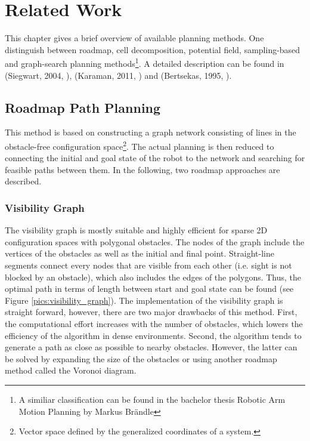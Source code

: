 \chapter{Related Work }
\label{sec:related_work}

This chapter gives a brief overview of available planning methods. One distinguish between roadmap, cell decomposition, potential field, sampling-based and graph-search planning methods\footnote{A similiar classification can be found in the bachelor thesis Robotic Arm Motion Planning by Markus Br\"andle}. A detailed description can be found in (Siegwart, 2004, \cite{Siegwart2004}), (Karaman, 2011, \cite{Karaman2011}) and (Bertsekas, 1995, \cite{Bertsekas1995}).

\section{Roadmap Path Planning}

This method is based on constructing a graph network consisting of lines in the obstacle-free configuration space\footnote{Vector space defined by the generalized coordinates of a system.}. The actual planning is then reduced to connecting the initial and goal state of the robot to the network and searching for feasible paths between them. In the following, two roadmap approaches are described.

\subsection{Visibility Graph}

The visibility graph is mostly suitable and highly efficient for sparse 2D configuration spaces with polygonal obstacles. The nodes of the graph include the vertices of the obstacles as well as the initial and final point. Straight-line segments connect every nodes that are visible from each other (i.e. sight is not blocked by an obstacle), which also includes the edges of the polygons. Thus, the optimal path in terms of length between start and goal state can be found (see Figure \ref{pics:visibility_graph}). The implementation of the visibility graph is straight forward, however, there are two major drawbacks of this method. First, the computational effort increases with the number of obstacles, which lowers the efficiency of the algorithm in dense environments. Second, the algorithm tends to generate a path as close as possible to nearby obstacles. However, the latter can be solved by expanding the size of the obstacles or using another roadmap method called the Voronoi diagram. 

